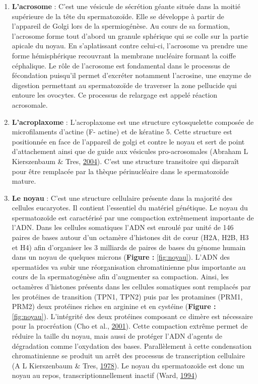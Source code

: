\documentclass[12pt,twoside]{reedthesis}
\providecommand{\tightlist}{%
  \setlength{\itemsep}{0pt}\setlength{\parskip}{0pt}}
\theoremstyle{definition}
\theoremstyle{definition}
\theoremstyle{remark}
\begin{document}
  \begin{enumerate}
  \def\labelenumi{\arabic{enumi}.}
  \tightlist
  \item
    \textbf{L'acrosome} : C'est une vésicule de sécrétion géante située
    dans la moitié supérieure de la tête du spermatozoïde. Elle se
    développe à partir de l'appareil de Golgi lors de la spermiogénèse. Au
    cours de sa formation, l'acrosome forme tout d'abord un granule
    sphérique qui se colle sur la partie apicale du noyau. En
    s'aplatissant contre celui-ci, l'acrosome va prendre une forme
    hémisphérique recouvrant la membrane nucléaire formant la coiffe
    céphalique. Le rôle de l'acrosome est fondamental dans le processus de
    fécondation puisqu'il permet d'excréter notamment l'acrosine, une
    enzyme de digestion permettant au spermatozoïde de traverser la zone
    pellucide qui entoure les ovocytes. Ce processus de relargage est
    appelé réaction acrosomale.\\
  \item
    \textbf{L'acroplaxome} : L'acroplaxome est une structure cytosquelette
    composée de microfilaments d'actine (F- actine) et de kératine 5.
    Cette structure est positionnée en face de l'appareil de golgi et
    contre le noyau et sert de point d'attachement ainsi que de guide aux
    vésicules pro-acrosomales (Abraham L Kierszenbaum \& Tres,
    \protect\hyperlink{ref-Kierszenbaum2004}{2004}). C'est une structure
    transitoire qui disparaît pour être remplacée par la thèque
    périnucléaire dans le spermatozoïde mature.\\
  \item
    \textbf{Le noyau} : C'est une structure cellulaire présente dans la
    majorité des cellules eucaryotes. Il contient l'essentiel du matériel
    génétique. Le noyau du spermatozoïde est caractérisé par une
    compaction extrêmement importante de l'ADN. Dans les cellules
    somatiques l'ADN est enroulé par unité de 146 paires de bases autour
    d'un octamère d'histones dit de cœur (H2A, H2B, H3 et H4) afin
    d'organiser les 3 milliards de paires de bases du génome humain dans
    un noyau de quelques microns (\textbf{Figure : }\ref{fig:noyau}).
    L'ADN des spermatides va subir une réorganisation chromatinienne plus
    importante au cours de la spermatogénèse afin d'augmenter sa
    compaction. Ainsi, les octamères d'histones présents dans les cellules
    somatiques sont remplacés par les protéines de transition (TPN1, TPN2)
    puis par les protamines (PRM1, PRM2) deux protéines riches en arginine
    et en cystéine (\textbf{Figure : }\ref{fig:noyau}). L'intégrité des
    deux protéines composant ce dimère est nécessaire pour la procréation
    (Cho et al., \protect\hyperlink{ref-Cho2001}{2001}). Cette compaction
    extrême permet de réduire la taille du noyau, mais aussi de protéger
    l'ADN d'agents de dégradation comme l'oxydation des bases.
    Parallèlement à cette condensation chromatinienne se produit un arrêt
    des processus de transcription cellulaire (A L Kierszenbaum \& Tres,
    \protect\hyperlink{ref-Kierszenbaum1978}{1978}). Le noyau du
    spermatozoïde est donc un noyau au repos, transcriptionnellement
    inactif (Ward, \protect\hyperlink{ref-Ward1994}{1994})
  \end{enumerate}
  
\end{document}
